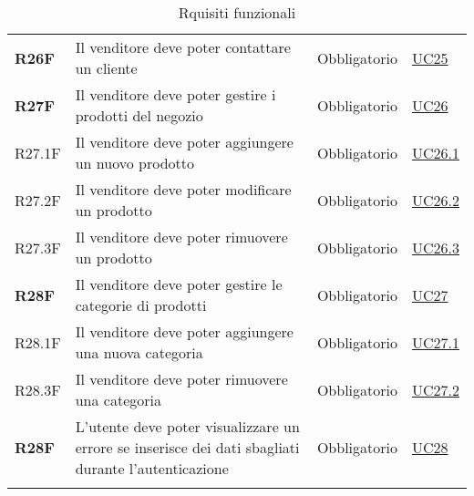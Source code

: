 \begin{center}
\begin{longtable}[!h]{p{50px} p{245px} p{75px} p{50px}}
        \textbf{R26F}                         & Il venditore deve poter contattare un cliente                                                                                      & Obbligatorio             & \hyperref[sec:UC25]{UC25}                    \\
        \textbf{R27F}                         & Il venditore deve poter gestire i prodotti del negozio                                                                             & Obbligatorio             & \hyperref[sec:UC26]{UC26}                    \\
        R27.1F                                & Il venditore deve poter aggiungere un nuovo prodotto                                                                               & Obbligatorio             & \hyperref[sec:UC26.1]{UC26.1}                \\
        R27.2F                                & Il venditore deve poter modificare un prodotto                                                                                     & Obbligatorio             & \hyperref[sec:UC26.2]{UC26.2}                \\
        R27.3F                                & Il venditore deve poter rimuovere un prodotto                                                                                      & Obbligatorio             & \hyperref[sec:UC26.3]{UC26.3}                \\
        \textbf{R28F}                         & Il venditore deve poter gestire le categorie di prodotti                                                                           & Obbligatorio             & \hyperref[sec:UC27]{UC27}                    \\
        R28.1F                                & Il venditore deve poter aggiungere una nuova categoria                                                                             & Obbligatorio             & \hyperref[sec:UC27.1]{UC27.1}                \\
        R28.3F                                & Il venditore deve poter rimuovere una categoria                                                                                    & Obbligatorio             & \hyperref[sec:UC27.2]{UC27.2}                \\
        \textbf{R28F}                         & L'utente deve poter visualizzare un errore se inserisce dei dati sbagliati durante l'autenticazione                                & Obbligatorio             & \hyperref[sec:UC28]{UC28}                    \\
        \rowcolor{white}\caption{Rquisiti funzionali}                                                                                                                                                                                                        \\
    \end{longtable}
\end{center}

